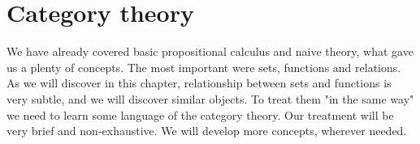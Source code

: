 
\chapter{Category theory}
\label{chap:category_theory}

We have already covered basic propositional calculus and naive theory, what gave us a plenty of concepts. The most important were sets, functions and relations. As we will discover in this chapter, relationship between sets and functions is very subtle, and we will discover similar objects. To treat them "in the same way" we need to learn some language of the category theory. Our treatment will be very brief and non-exhaustive. We will develop more concepts, wherever needed.


